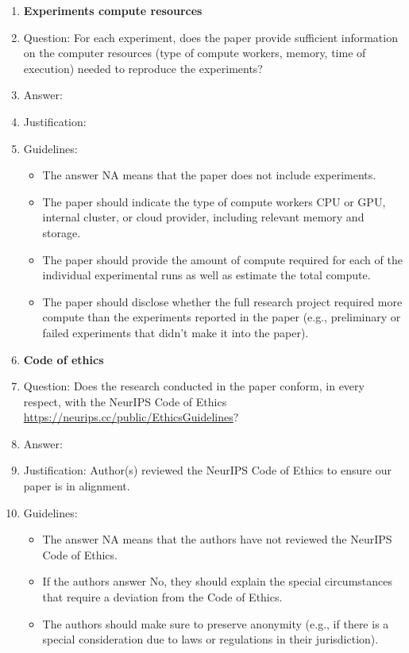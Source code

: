 \documentclass{article}
\begin{document}
\begin{enumerate}
\item {\bf Experiments compute resources}
    \item[] Question: For each experiment, does the paper provide sufficient information on the computer resources (type of compute workers, memory, time of execution) needed to reproduce the experiments?
    \item[] Answer: \answerTODO{} %
    \item[] Justification: \justificationTODO{}
    \item[] Guidelines:
    \begin{itemize}
        \item The answer NA means that the paper does not include experiments.
        \item The paper should indicate the type of compute workers CPU or GPU, internal cluster, or cloud provider, including relevant memory and storage.
        \item The paper should provide the amount of compute required for each of the individual experimental runs as well as estimate the total compute. 
        \item The paper should disclose whether the full research project required more compute than the experiments reported in the paper (e.g., preliminary or failed experiments that didn't make it into the paper). 
    \end{itemize}
    
\item {\bf Code of ethics}
    \item[] Question: Does the research conducted in the paper conform, in every respect, with the NeurIPS Code of Ethics \url{https://neurips.cc/public/EthicsGuidelines}?
    \item[] Answer: \answerYes{} %
    \item[] Justification: Author(s) reviewed the NeurIPS Code of Ethics to ensure our paper is in alignment.
    \item[] Guidelines:
    \begin{itemize}
        \item The answer NA means that the authors have not reviewed the NeurIPS Code of Ethics.
        \item If the authors answer No, they should explain the special circumstances that require a deviation from the Code of Ethics.
        \item The authors should make sure to preserve anonymity (e.g., if there is a special consideration due to laws or regulations in their jurisdiction).
    \end{itemize}



\end{enumerate}
\end{document}
